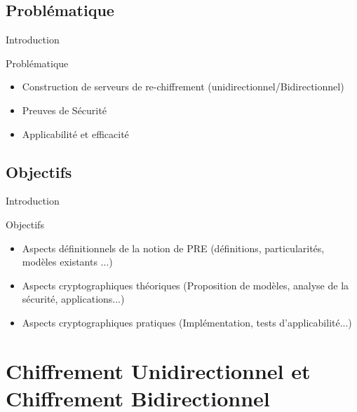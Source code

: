 \documentclass{beamer}
\begin{document}
\subsection{Problématique}
\begin{frame}{Introduction}
	\begin{block}{Problématique}
		\begin{itemize}
			\item Construction de serveurs de re-chiffrement (unidirectionnel/Bidirectionnel)\pause
			\item Preuves de Sécurité \pause
			\item Applicabilité et efficacité \pause
		\end{itemize}
	\end{block}
\end{frame}

\subsection{Objectifs}
\begin{frame}{Introduction}
	\begin{block}{Objectifs}
		\begin{itemize}
			\item Aspects définitionnels de la notion de PRE (définitions, particularités, modèles existants ...) \pause
			\item Aspects cryptographiques théoriques (Proposition de modèles, analyse de la sécurité, applications...) \pause
			\item Aspects cryptographiques pratiques (Implémentation, tests d'applicabilité...) \pause
		\end{itemize}
	\end{block}
\end{frame}

\section{Chiffrement Unidirectionnel et Chiffrement Bidirectionnel}
\end{document}
